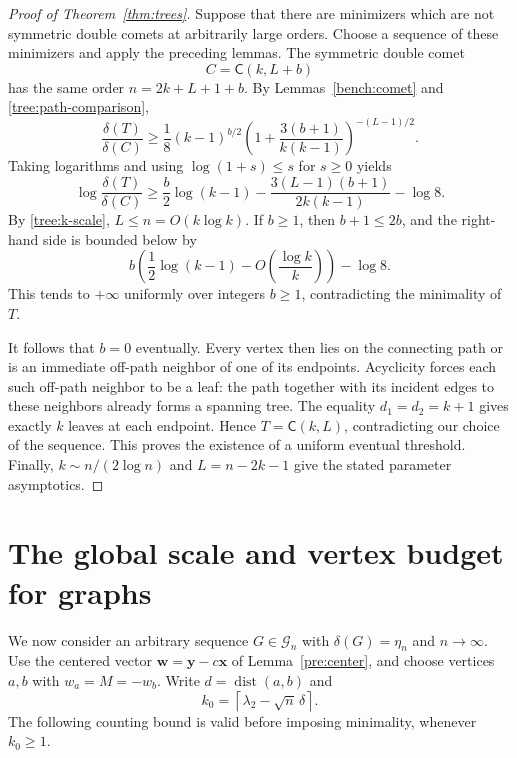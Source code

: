 \documentclass[11pt,a4paper]{article}
\numberwithin{equation}{section}
\theoremstyle{definition}
\theoremstyle{remark}
\newcommand{\dist}{\operatorname{dist}}
\newcommand{\Comet}{\mathsf{C}}
\begin{document}
\begin{proof}[Proof of Theorem~\ref{thm:trees}]
Suppose that there are minimizers which are not symmetric double
comets at arbitrarily large orders. Choose a sequence of these
minimizers and apply the preceding lemmas. The symmetric double
comet
\[
 C=\Comet(k,L+b)
\]
has the same order $n=2k+L+1+b$. By Lemmas~\ref{bench:comet} and
\ref{tree:path-comparison},
\begin{equation}\label{tree:gap-ratio}
 \frac{\delta(T)}{\delta(C)}
 \geq\frac18(k-1)^{b/2}
 \left(1+\frac{3(b+1)}{k(k-1)}\right)^{-(L-1)/2}.
\end{equation}
Taking logarithms and using $\log(1+s)\leq s$ for $s\geq0$ yields
\begin{equation}\label{tree:log-ratio}
 \log\frac{\delta(T)}{\delta(C)}
 \geq\frac b2\log(k-1)
       -\frac{3(L-1)(b+1)}{2k(k-1)}-\log8.
\end{equation}
By \eqref{tree:k-scale}, $L\leq n=O(k\log k)$.
If $b\geq1$, then $b+1\leq2b$, and the right-hand side is bounded
below by
\[
 b\left(\frac12\log(k-1)-O\left(\frac{\log k}{k}\right)\right)
 -\log8.
\]
This tends to $+\infty$ uniformly over integers $b\geq1$,
contradicting the minimality of $T$.

It follows that $b=0$ eventually. Every vertex then lies on the
connecting path or is an immediate off-path neighbor of one of its
endpoints. Acyclicity forces each such off-path neighbor to be a
leaf: the path together with its incident edges to these neighbors
already forms a spanning tree. The equality $d_1=d_2=k+1$ gives
exactly $k$ leaves at each endpoint. Hence $T=\Comet(k,L)$,
contradicting our choice of the sequence. This proves the existence
of a uniform eventual threshold. Finally,
$k\sim n/(2\log n)$ and $L=n-2k-1$ give the stated parameter
asymptotics.
\end{proof}

\section{The global scale and vertex budget for graphs}
\label{sec:graph-scale}

We now consider an arbitrary sequence $G\in\mathcal G_n$ with
$\delta(G)=\eta_n$ and $n\to\infty$. Use the centered vector
$\mathbf w=\mathbf y-c\mathbf x$ of Lemma~\ref{pre:center}, and choose
vertices $a,b$ with $w_a=M=-w_b$. Write $d=\dist(a,b)$ and
\begin{equation}\label{graph:k0}
 k_0=\left\lceil\lambda_2-\sqrt n\,\delta\right\rceil.
\end{equation}
The following counting bound is valid before imposing minimality,
whenever $k_0\ge1$.
\end{document}
